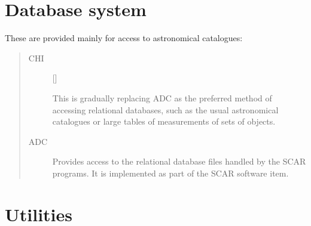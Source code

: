 \section{Database system}

These are provided mainly for access to astronomical catalogues:
\begin{quote}
\begin{description}

\item [CHI] \hfill []

 This is gradually replacing ADC as the preferred method of accessing
 relational databases, such as the usual astronomical catalogues or large
 tables of measurements of sets of objects.

\item [ADC] \hfill

 Provides access to the relational database files handled by the SCAR programs.
 It is implemented as part of the SCAR software item.

\end{description}
\end{quote}

\section{Utilities}


